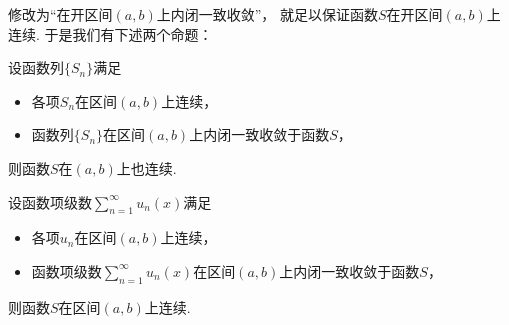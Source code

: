 修改为“在开区间\((a,b)\)上内闭一致收敛”，
就足以保证函数\(S\)在开区间\((a,b)\)上连续.
于是我们有下述两个命题：
\begin{proposition}
设函数列\(\{S_n\}\)满足\begin{itemize}
	\item 各项\(S_n\)在区间\((a,b)\)上连续，
	\item 函数列\(\{S_n\}\)在区间\((a,b)\)上内闭一致收敛于函数\(S\)，
\end{itemize}
则函数\(S\)在\((a,b)\)上也连续.
\end{proposition}
\begin{proposition}
设函数项级数\(\sum_{n=1}^\infty u_n(x)\)满足\begin{itemize}
	\item 各项\(u_n\)在区间\((a,b)\)上连续，
	\item 函数项级数\(\sum_{n=1}^\infty u_n(x)\)在区间\((a,b)\)上内闭一致收敛于函数\(S\)，
\end{itemize}
则函数\(S\)在区间\((a,b)\)上连续.
\end{proposition}

